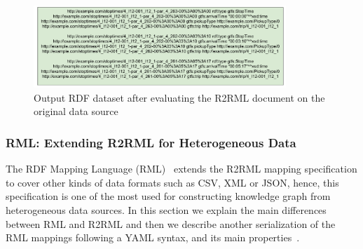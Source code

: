 \begin{figure}[!ht]
\centering
\includegraphics[width=0.85\textwidth]{figures/state-of-the-art/RDF from Stop_times.pdf}
\caption[RDF Generation from R2RML mapping rules]{Output RDF dataset after evaluating the R2RML document on the original data source}
\label{fig:soa_rdf}
\end{figure}



\subsubsection{RML: Extending R2RML for Heterogeneous Data}
The RDF Mapping Language (RML)~\citep{dimou2014rml} extends the R2RML mapping specification to cover other kinds of data formats such as CSV, XML or JSON, hence, this specification is one of the most used for constructing knowledge graph from heterogeneous data sources. In this section we explain the main differences between RML and R2RML and then we describe another serialization of the RML mappings following a YAML syntax, and its main properties~\citep{Heyvaert2018Declarative}.


